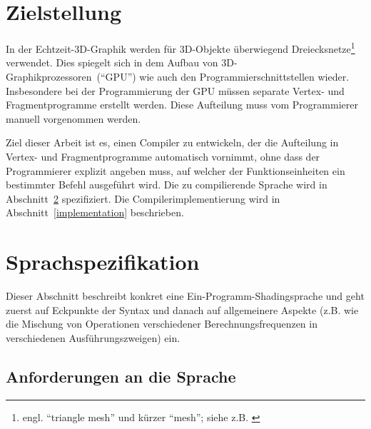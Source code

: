\documentclass[twoside,a4paper,fleqn,12pt]{article}
\begin{document}
\section{Zielstellung}

In der Echtzeit-3D-Graphik werden für 3D-Objekte überwiegend Dreiecksnetze\footnote{engl. ``triangle mesh'' und kürzer ``mesh''; siehe z.B. \cite{watt_de}}
verwendet. Dies spiegelt sich in dem Aufbau von 3D-Graphikprozessoren~("`GPU"') wie auch
den Programmierschnittstellen  wieder. Insbesondere bei der Programmierung der GPU müssen
separate Vertex- und Fragmentprogramme %
erstellt werden. Diese Aufteilung muss vom Programmierer manuell vorgenommen werden.

Ziel dieser Arbeit ist es, einen Compiler zu entwickeln, der die Aufteilung in Vertex- und Fragmentprogramme automatisch vornimmt,
ohne dass der Programmierer explizit angeben muss, auf welcher der Funktionseinheiten ein bestimmter Befehl ausgeführt wird.
Die zu compilierende Sprache wird in Abschnitt~\ref{langspec} spezifiziert. Die Compilerimplementierung wird in Abschnitt~\ref{implementation}
beschrieben.


\section{Sprachspezifikation}
\label{langspec}

Dieser Abschnitt beschreibt konkret eine Ein-Programm-Shadingsprache und geht zuerst auf Eckpunkte der Syntax und danach
auf allgemeinere Aspekte (z.B. wie die Mischung von Operationen verschiedener Berechnungsfrequenzen in verschiedenen Ausführungszweigen) ein.

\subsection{Anforderungen an die Sprache}
\end{document}
